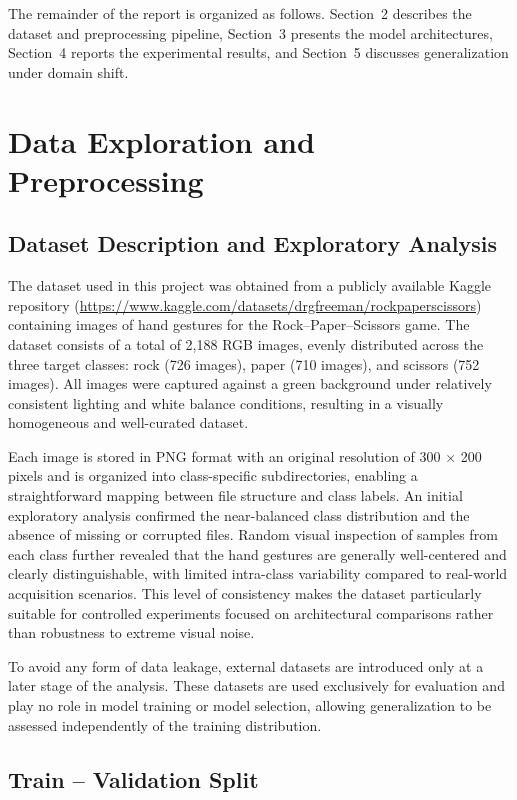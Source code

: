 \documentclass{article}
\begin{document}
The remainder of the report is organized as follows. Section~2 describes the
dataset and preprocessing pipeline, Section~3 presents the model architectures,
Section~4 reports the experimental results, and Section~5 discusses generalization under domain
shift.

\section{Data Exploration and Preprocessing}
\subsection{Dataset Description and Exploratory Analysis}

The dataset used in this project was obtained from a publicly available
Kaggle repository (\url{https://www.kaggle.com/datasets/drgfreeman/rockpaperscissors}) 
containing images of hand gestures for the
Rock--Paper--Scissors game. The dataset consists of a total of 2,188 RGB images,
evenly distributed across the three target classes: rock (726 images),
paper (710 images), and scissors (752 images). All images were captured
against a green background under relatively consistent lighting and
white balance conditions, resulting in a visually homogeneous and
well-curated dataset.

Each image is stored in PNG format with an original resolution of 300 ×
200 pixels and is organized into class-specific subdirectories, enabling
a straightforward mapping between file structure and class labels. An
initial exploratory analysis confirmed the near-balanced class
distribution and the absence of missing or corrupted files. Random
visual inspection of samples from each class further revealed that the
hand gestures are generally well-centered and clearly distinguishable,
with limited intra-class variability compared to real-world acquisition
scenarios. This level of consistency makes the dataset particularly
suitable for controlled experiments focused on architectural comparisons
rather than robustness to extreme visual noise.

To avoid any form of data leakage, external datasets are introduced only at a
later stage of the analysis. These datasets are used exclusively for evaluation
and play no role in model training or model selection, allowing generalization
to be assessed independently of the training distribution.

\subsection{Train -- Validation Split}
\end{document}
